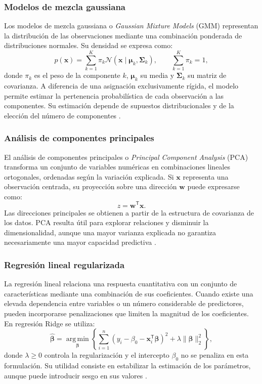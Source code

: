 \subsubsection{Modelos de mezcla gaussiana}
Los modelos de mezcla gaussiana o \textit{Gaussian Mixture Models} (GMM) representan la distribución de las observaciones mediante una combinación ponderada de distribuciones normales. Su densidad se expresa como:
\begin{equation}
p(\mathbf{x})=\sum_{k=1}^{K}\pi_k
\mathcal{N}(\mathbf{x}\mid\boldsymbol{\mu}_k,\boldsymbol{\Sigma}_k),
\qquad \sum_{k=1}^{K}\pi_k=1,
\end{equation}
donde $\pi_k$ es el peso de la componente $k$, $\boldsymbol{\mu}_k$ su media y $\boldsymbol{\Sigma}_k$ su matriz de covarianza. A diferencia de una asignación exclusivamente rígida, el modelo permite estimar la pertenencia probabilística de cada observación a las componentes. Su estimación depende de supuestos distribucionales y de la elección del número de componentes \cite{bishop2006pattern}.

\subsubsection{Análisis de componentes principales}
El análisis de componentes principales o \textit{Principal Component Analysis} (PCA) transforma un conjunto de variables numéricas en combinaciones lineales ortogonales, ordenadas según la variación explicada. Si $\mathbf{x}$ representa una observación centrada, su proyección sobre una dirección $\mathbf{w}$ puede expresarse como:
\begin{equation}
z=\mathbf{w}^{\mathsf{T}}\mathbf{x}.
\end{equation}
Las direcciones principales se obtienen a partir de la estructura de covarianza de los datos. PCA resulta útil para explorar relaciones y disminuir la dimensionalidad, aunque una mayor varianza explicada no garantiza necesariamente una mayor capacidad predictiva \cite{hastie2009elements,bishop2006pattern}.

\subsubsection{Regresión lineal regularizada}
La regresión lineal relaciona una respuesta cuantitativa con un conjunto de características mediante una combinación de sus coeficientes. Cuando existe una elevada dependencia entre variables o un número considerable de predictores, pueden incorporarse penalizaciones que limiten la magnitud de los coeficientes. En regresión Ridge se utiliza:
\begin{equation}
\hat{\boldsymbol{\beta}}=
\underset{\boldsymbol{\beta}}{\operatorname{arg\,min}}
\left\{
\sum_{i=1}^{n}(y_i-\beta_0-\mathbf{x}_i^{\mathsf T}\boldsymbol{\beta})^2+
\lambda\|\boldsymbol{\beta}\|_2^2
\right\},
\end{equation}
donde $\lambda\geq 0$ controla la regularización y el intercepto $\beta_0$ no se penaliza en esta formulación. Su utilidad consiste en estabilizar la estimación de los parámetros, aunque puede introducir sesgo en sus valores \cite{hoerl1970ridge,hastie2009elements}.

